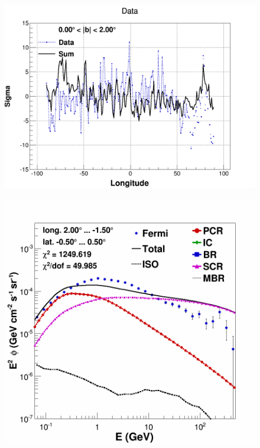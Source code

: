 \begin{figure}[h]
  \centering
  \begin{minipage}[h]{0.45\textwidth}
  	\centering
	\includegraphics[width=1.\linewidth]{pic/results/SCRonly_weniger_sum_0-2.png}
  	\subcaption{}
  	\label{fig:SCRonly_weniger}
  \end{minipage}
  \hfill
  \begin{minipage}[h]{0.45\textwidth}
	  \centering
	  \includegraphics[width=1.\linewidth]{pic/results/SCRonly_CMZ.png}

\end{minipage}
\end{figure}
